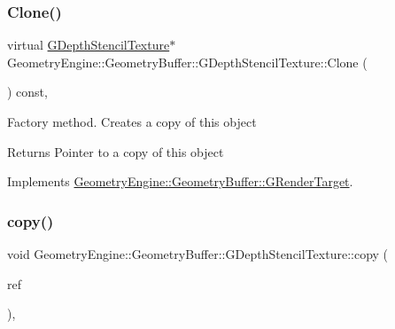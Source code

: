\subsubsection{\texorpdfstring{Clone()}{Clone()}}
{\footnotesize\ttfamily virtual \mbox{\hyperlink{class_geometry_engine_1_1_geometry_buffer_1_1_g_depth_stencil_texture}{G\+Depth\+Stencil\+Texture}}$\ast$ Geometry\+Engine\+::\+Geometry\+Buffer\+::\+G\+Depth\+Stencil\+Texture\+::\+Clone (\begin{DoxyParamCaption}{ }\end{DoxyParamCaption}) const\hspace{0.3cm}{\ttfamily [inline]}, {\ttfamily [virtual]}}

Factory method. Creates a copy of this object \begin{DoxyReturn}{Returns}
Pointer to a copy of this object 
\end{DoxyReturn}


Implements \mbox{\hyperlink{class_geometry_engine_1_1_geometry_buffer_1_1_g_render_target_a3b14d8929cf9d2acb6bc263c709ff019}{Geometry\+Engine\+::\+Geometry\+Buffer\+::\+G\+Render\+Target}}.

\mbox{\label{class_geometry_engine_1_1_geometry_buffer_1_1_g_depth_stencil_texture_a80ef1aeb049b89848d7855f53107a9f0}} 
\subsubsection{\texorpdfstring{copy()}{copy()}}
{\footnotesize\ttfamily void Geometry\+Engine\+::\+Geometry\+Buffer\+::\+G\+Depth\+Stencil\+Texture\+::copy (\begin{DoxyParamCaption}\item[{const \mbox{\hyperlink{class_geometry_engine_1_1_geometry_buffer_1_1_g_depth_stencil_texture}{G\+Depth\+Stencil\+Texture}} \&}]{ref }\end{DoxyParamCaption})\hspace{0.3cm}{\ttfamily [protected]}, {\ttfamily [virtual]}}

